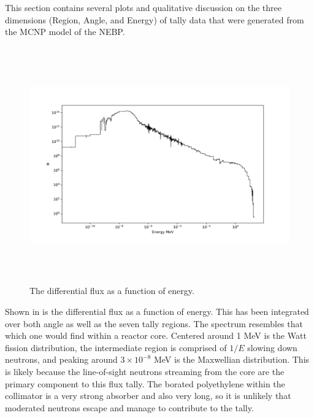 This section contains several plots and qualitative discussion on the three dimensions (Region, Angle, and Energy) of tally data that were generated from the MCNP model of the NEBP.


\begin{figure}[htb]
\centering
\includegraphics[height=4in]{tex/figures/flux_erg.png}
\caption[Flux vs. Energy]{The differential flux as a function of energy.}
\label{fig:flux_erg}
\end{figure}

Shown in  is the differential flux as a function of energy.
This has been integrated over both angle as well as the seven tally regions.
The spectrum resembles that which one would find within a reactor core.
Centered around 1 MeV is the Watt fission distribution, the intermediate region is comprised of $1/E$ slowing down neutrons, and peaking around $3 \times 10^{-8}$ MeV is the Maxwellian distribution.
This is likely because the line-of-sight neutrons streaming from the core are the primary component to this flux tally.
The borated polyethylene within the collimator is a very strong absorber and also very long, so it is unlikely that moderated neutrons escape and manage to contribute to the tally.


